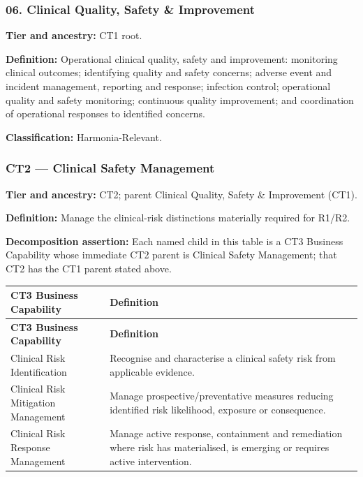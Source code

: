 \label{rad:business:522}
\subsubsection*{06. Clinical Quality, Safety \& Improvement}
\label{rad:business:524}

\textbf{Tier and ancestry:} CT1 root.

\label{rad:business:526}

\textbf{Definition:} Operational clinical quality, safety and improvement: monitoring clinical outcomes; identifying quality and safety concerns; adverse event and incident management, reporting and response; infection control; operational quality and safety monitoring; continuous quality improvement; and coordination of operational responses to identified concerns.

\label{rad:business:528}

\textbf{Classification:} Harmonia-Relevant.

\label{rad:business:530}
\subsubsection*{CT2 — Clinical Safety Management}
\label{rad:business:532}

\textbf{Tier and ancestry:} CT2; parent Clinical Quality, Safety \& Improvement (CT1).

\label{rad:business:534}

\textbf{Definition:} Manage the clinical-risk distinctions materially required for R1/\allowbreak{}R2.

\label{rad:business:536}

\textbf{Decomposition assertion:} Each named child in this table is a CT3 Business Capability whose immediate CT2 parent is Clinical Safety Management; that CT2 has the CT1 parent stated above.

\label{rad:business:538}
\begingroup\small\setlength{\TableWidth}{\dimexpr\linewidth-4\tabcolsep-3\arrayrulewidth\relax}
\begin{longtable}{|>{\raggedright\arraybackslash}p{0.35\TableWidth}|>{\raggedright\arraybackslash}p{0.65\TableWidth}|}
\hline\rowcolor{TableHead}\textbf{CT3 Business Capability} & \textbf{Definition}\\\hline\endfirsthead
\hline\rowcolor{TableHead}\textbf{CT3 Business Capability} & \textbf{Definition}\\\hline\endhead
\hline\endfoot
Clinical Risk Identification & Recognise and characterise a clinical safety risk from applicable evidence.\\\hline
Clinical Risk Mitigation Management & Manage prospective/\allowbreak{}preventative measures reducing identified risk likelihood, exposure or consequence.\\\hline
Clinical Risk Response Management & Manage active response, containment and remediation where risk has materialised, is emerging or requires active intervention.\\\hline
\end{longtable}\endgroup
{}\label{rad:business:544}


